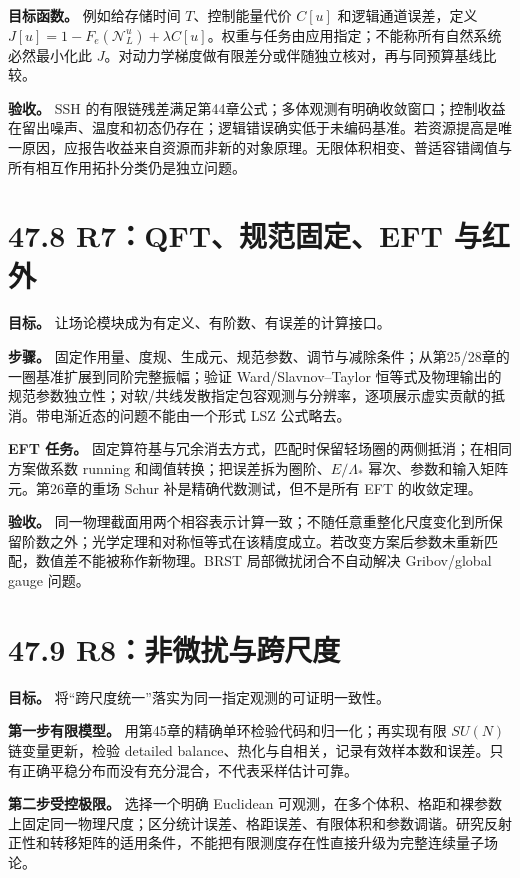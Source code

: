 \documentclass[
  11pt,
  oneside]{book}
\begin{document}
\textbf{目标函数。} 例如给存储时间 \(T\)、控制能量代价 \(C[u]\)
和逻辑通道误差，定义
\(J[u]=1-F_e(\mathcal N_L^u)+\lambda C[u]\)。权重与任务由应用指定；不能称所有自然系统必然最小化此
\(J\)。对动力学梯度做有限差分或伴随独立核对，再与同预算基线比较。

\textbf{验收。} SSH
的有限链残差满足第44章公式；多体观测有明确收敛窗口；控制收益在留出噪声、温度和初态仍存在；逻辑错误确实低于未编码基准。若资源提高是唯一原因，应报告收益来自资源而非新的对象原理。无限体积相变、普适容错阈值与所有相互作用拓扑分类仍是独立问题。

\section{47.8 R7：QFT、规范固定、EFT 与红外}

\textbf{目标。} 让场论模块成为有定义、有阶数、有误差的计算接口。

\textbf{步骤。}
固定作用量、度规、生成元、规范参数、调节与减除条件；从第25/28章的一圈基准扩展到同阶完整振幅；验证
Ward/Slavnov--Taylor
恒等式及物理输出的规范参数独立性；对软/共线发散指定包容观测与分辨率，逐项展示虚实贡献的抵消。带电渐近态的问题不能由一个形式
LSZ 公式略去。

\textbf{EFT 任务。}
固定算符基与冗余消去方式，匹配时保留轻场圈的两侧抵消；在相同方案做系数
running 和阈值转换；把误差拆为圈阶、\(E/\Lambda_*\)
幂次、参数和输入矩阵元。第26章的重场 Schur 补是精确代数测试，但不是所有
EFT 的收敛定理。

\textbf{验收。}
同一物理截面用两个相容表示计算一致；不随任意重整化尺度变化到所保留阶数之外；光学定理和对称恒等式在该精度成立。若改变方案后参数未重新匹配，数值差不能被称作新物理。BRST
局部微扰闭合不自动解决 Gribov/global gauge 问题。

\section{47.9 R8：非微扰与跨尺度}

\textbf{目标。} 将``跨尺度统一''落实为同一指定观测的可证明一致性。

\textbf{第一步有限模型。} 用第45章的精确单环检验代码和归一化；再实现有限
\(SU(N)\) 链变量更新，检验 detailed
balance、热化与自相关，记录有效样本数和误差。只有正确平稳分布而没有充分混合，不代表采样估计可靠。

\textbf{第二步受控极限。} 选择一个明确 Euclidean
可观测，在多个体积、格距和裸参数上固定同一物理尺度；区分统计误差、格距误差、有限体积和参数调谐。研究反射正性和转移矩阵的适用条件，不能把有限测度存在性直接升级为完整连续量子场论。
\end{document}
